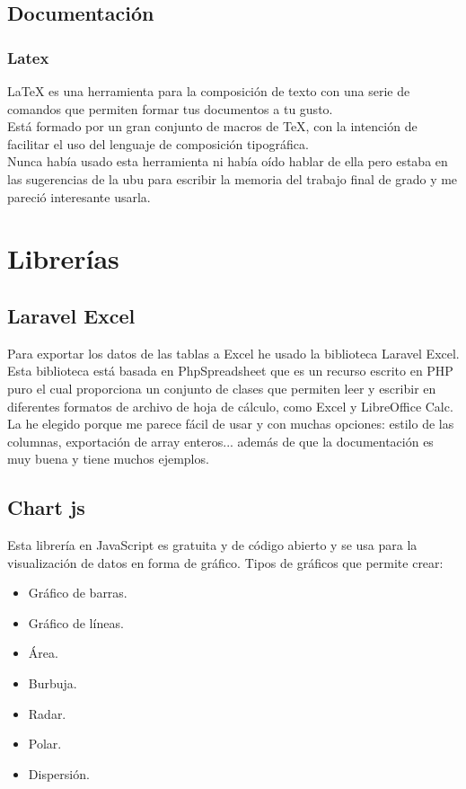 \subsection{Documentación}
\subsubsection{Latex}
\LaTeX{} es una herramienta para la composición de texto con una serie de comandos que permiten formar tus documentos a tu gusto.\\
Está formado por un gran conjunto de macros de TeX, con la intención de facilitar el uso del lenguaje de composición tipográfica.\cite{wiki:latex}\\
Nunca había usado esta herramienta ni había oído hablar de ella pero estaba en las sugerencias de la ubu para escribir la memoria del trabajo final de grado y me pareció interesante usarla. 
\section{Librerías}
\subsection{Laravel Excel}
Para exportar los datos de las tablas a Excel he usado la biblioteca Laravel Excel.
Esta biblioteca está basada en PhpSpreadsheet que es un recurso escrito en PHP puro el cual proporciona un conjunto de clases que permiten leer y escribir en diferentes formatos de archivo de hoja de cálculo, como Excel y LibreOffice Calc.\cite{LaravelExcel}\\
La he elegido porque me parece fácil de usar y con muchas opciones: estilo de las columnas, exportación de array enteros... además de que la documentación es muy buena y tiene muchos ejemplos.
\subsection{Chart js}
Esta librería en JavaScript es gratuita y de código abierto y se usa para la visualización de datos en forma de gráfico.
Tipos de gráficos que permite crear:
\begin{itemize}
    \item Gráfico de barras.
    \item Gráfico de líneas.
    \item Área.
    \item Burbuja.
    \item Radar.
    \item Polar.
    \item Dispersión.
\end{itemize}
